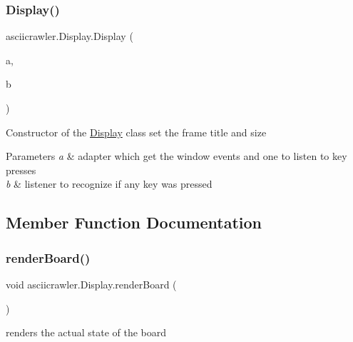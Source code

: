 \subsubsection{\texorpdfstring{Display()}{Display()}}
{\footnotesize\ttfamily asciicrawler.\+Display.\+Display (\begin{DoxyParamCaption}\item[{Window\+Adapter}]{a,  }\item[{Key\+Listener}]{b }\end{DoxyParamCaption})\hspace{0.3cm}{\ttfamily [inline]}}

Constructor of the \hyperlink{classasciicrawler_1_1Display}{Display} class set the frame title and size


\begin{DoxyParams}{Parameters}
{\em a} & adapter which get the window events and one to listen to key presses\\
\hline
{\em b} & listener to recognize if any key was pressed \\
\hline
\end{DoxyParams}


\subsection{Member Function Documentation}
\mbox{\label{classasciicrawler_1_1Display_ac78b41f2afc6b0732ab4cd54d7142604}} 
\subsubsection{\texorpdfstring{render\+Board()}{renderBoard()}}
{\footnotesize\ttfamily void asciicrawler.\+Display.\+render\+Board (\begin{DoxyParamCaption}{ }\end{DoxyParamCaption})\hspace{0.3cm}{\ttfamily [inline]}}

renders the actual state of the board \mbox{\label{classasciicrawler_1_1Display_afbfb9296a48fa04d148715918230d3b2}} 

